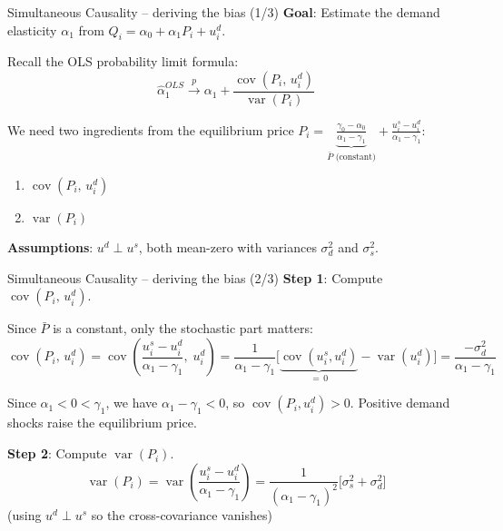 \documentclass[10pt]{beamer}
\begin{document}
\begin{frame}{Simultaneous Causality -- deriving the bias (1/3)}
\label{slide:simul_bias}
\textbf{Goal}: Estimate the demand elasticity $\alpha_1$ from $Q_i = \alpha_0 + \alpha_1 P_i + u_i^d$.

\pause
\vspace{0.5em}
Recall the OLS probability limit formula:
\[
\widehat{\alpha}_1^{OLS} \xrightarrow{p} \alpha_1 + \frac{\operatorname{cov}(P_i,\, u_i^d)}{\operatorname{var}(P_i)}
\]

\pause
We need two ingredients from the equilibrium price $P_i = \underbrace{\frac{\gamma_0 - \alpha_0}{\alpha_1 - \gamma_1}}_{\bar{P}\text{ (constant)}} + \frac{u_i^s - u_i^d}{\alpha_1 - \gamma_1}$:

\begin{enumerate}
  \item $\operatorname{cov}(P_i,\, u_i^d)$
  \item $\operatorname{var}(P_i)$
\end{enumerate}

\pause
\vspace{0.3em}
\textbf{Assumptions}: $u^d \perp u^s$, both mean-zero with variances $\sigma_d^2$ and $\sigma_s^2$.
\end{frame}

\begin{frame}{Simultaneous Causality -- deriving the bias (2/3)}
\textbf{Step 1}: Compute $\operatorname{cov}(P_i,\, u_i^d)$.

Since $\bar{P}$ is a constant, only the stochastic part matters:
\[
\operatorname{cov}(P_i,\, u_i^d) = \operatorname{cov}\!\left(\frac{u_i^s - u_i^d}{\alpha_1 - \gamma_1},\; u_i^d\right) = \frac{1}{\alpha_1 - \gamma_1}\Big[\underbrace{\operatorname{cov}(u_i^s, u_i^d)}_{=\,0} - \operatorname{var}(u_i^d)\Big] = \frac{-\sigma_d^2}{\alpha_1 - \gamma_1}
\]

\pause
Since $\alpha_1 < 0 < \gamma_1$, we have $\alpha_1 - \gamma_1 < 0$, so $\operatorname{cov}(P_i, u_i^d) > 0$. \alert{Positive demand shocks raise the equilibrium price.}

\pause
\vspace{0.5em}
\textbf{Step 2}: Compute $\operatorname{var}(P_i)$.
\[
\operatorname{var}(P_i) = \operatorname{var}\!\left(\frac{u_i^s - u_i^d}{\alpha_1 - \gamma_1}\right) = \frac{1}{(\alpha_1 - \gamma_1)^2}\Big[\sigma_s^2 + \sigma_d^2\Big]
\]
(using $u^d \perp u^s$ so the cross-covariance vanishes)
\end{frame}
\end{document}

